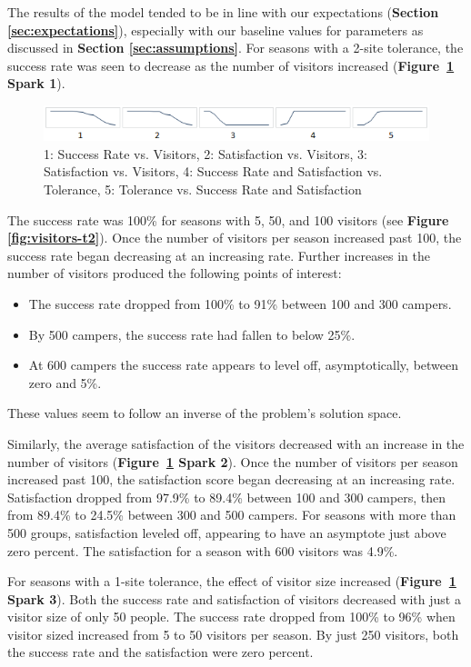 \documentclass[11pt]{article} %
\begin{document}
The results of the model tended to be in line with our
expectations (\textbf{Section \ref{sec:expectations}}), especially with
our baseline values for parameters as discussed in
\textbf{Section \ref{sec:assumptions}}.
For seasons with a 2-site tolerance, the success rate
was seen to decrease as the number of visitors increased
(\textbf{Figure~\ref{fig:sparklines} Spark 1}).

\begin{figure}[b]
  \centering
  \includegraphics[scale=.9]{imgs/sparklines.png}
  \caption{1: Success Rate vs. Visitors, 2: Satisfaction
    vs. Visitors, 3: Satisfaction vs. Visitors,
    4: Success Rate and Satisfaction vs. Tolerance, 5: Tolerance vs. Success Rate and Satisfaction}
  \label{fig:sparklines}
\end{figure}

The success rate was 100\% for seasons with 5, 50, and 100
visitors (see \textbf{Figure \ref{fig:visitors-t2}}).
Once the number of visitors per season increased past 100, the
success rate began decreasing at an increasing rate.
Further increases in the number of visitors produced the following points
of interest:
\begin{itemize}
\item The success rate dropped from 100\% to 91\% between 100 and 300 campers.
\item By 500 campers, the success rate had fallen to below 25\%.
\item At 600 campers the success rate appears to level off, asymptotically,
between zero and 5\%.
\end{itemize}
These values seem to follow an inverse of the problem's solution space.

Similarly, the average satisfaction of the visitors decreased with an increase in the
number of visitors (\textbf{Figure~\ref{fig:sparklines} Spark 2}).
Once the number of visitors per season increased past 100, the
satisfaction score began decreasing at an increasing rate. Satisfaction dropped
from 97.9\% to 89.4\% between 100 and 300 campers, then from 89.4\%
to 24.5\% between 300 and 500 campers. For seasons with more
than 500 groups, satisfaction leveled off, appearing to have an
asymptote just above zero percent. The satisfaction for a season with 600 visitors
was 4.9\%.

For seasons with a  1-site tolerance, the effect of visitor size increased
(\textbf{Figure~\ref{fig:sparklines} Spark 3}). Both the
success rate and satisfaction of visitors decreased with just a visitor size of
only 50 people. The success rate dropped from 100\% to 96\%
when visitor sized increased from 5 to 50 visitors per season. By just 250
visitors, both the success rate and the satisfaction were zero percent.
\end{document}
